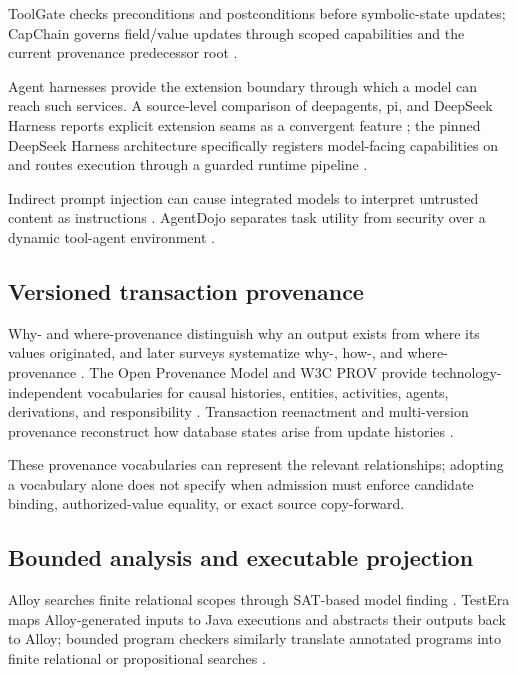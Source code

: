 ToolGate checks preconditions and postconditions before symbolic-state updates; CapChain governs field/value updates through scoped capabilities and the current provenance predecessor root \citep{liu2026toolgate,choong2026capchain}.

Agent harnesses provide the extension boundary through which a model can reach such services. A source-level comparison of deepagents, pi, and DeepSeek Harness reports explicit extension seams as a convergent feature \citep{dai2026harnesses}; the pinned DeepSeek Harness architecture specifically registers model-facing capabilities on  and routes execution through a guarded runtime pipeline \citep{deepseek2026architecture}.

Indirect prompt injection can cause integrated models to interpret untrusted content as instructions \citep{greshake2023indirect}. AgentDojo separates task utility from security over a dynamic tool-agent environment \citep{debenedetti2024agentdojo}.

\subsection{Versioned transaction provenance}

Why- and where-provenance distinguish why an output exists from where its values originated, and later surveys systematize why-, how-, and where-provenance \citep{buneman2001whywhere,cheney2009provenance}. The Open Provenance Model and W3C PROV provide technology-independent vocabularies for causal histories, entities, activities, agents, derivations, and responsibility \citep{moreau2011opm,moreau2013provdm}. Transaction reenactment and multi-version provenance reconstruct how database states arise from update histories \citep{arab2016rcsi,arab2018reenactment,arab2019thesis}.

These provenance vocabularies can represent the relevant relationships; adopting a vocabulary alone does not specify when admission must enforce candidate binding, authorized-value equality, or exact source copy-forward.

\subsection{Bounded analysis and executable projection}

Alloy searches finite relational scopes through SAT-based model finding \citep{jackson2002alloy,torlak2007kodkod}. TestEra maps Alloy-generated inputs to Java executions and abstracts their outputs back to Alloy; bounded program checkers similarly translate annotated programs into finite relational or propositional searches \citep{marinov2001testera,dennis2006sat,galeotti2013taco}.

